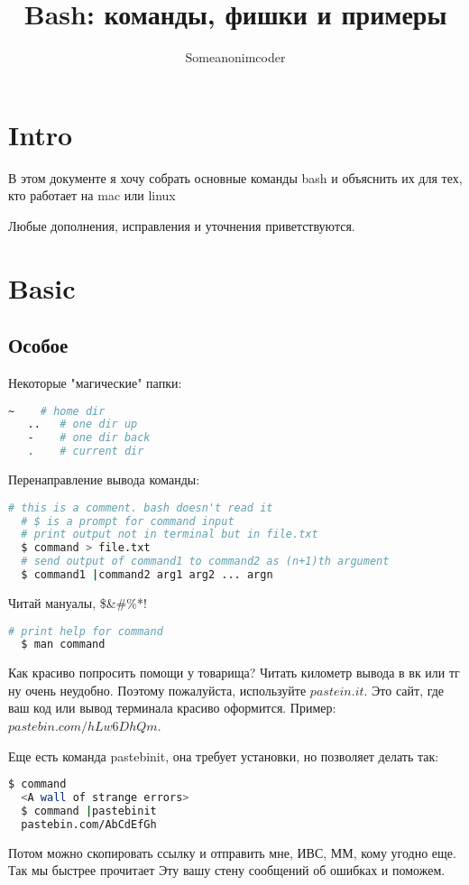 \documentclass[11pt]{article}
\title{\textbf{Bash: команды, фишки и примеры}}
\author{Someanonimcoder}
\date{}
\begin{document}
\maketitle
\thispagestyle{empty}

\section*{Intro}
В этом документе я хочу собрать основные команды bash и объяснить их для тех, кто работает на mac или linux

Любые дополнения, исправления и уточнения приветствуются.

\section*{Basic}
\subsection*{Особое}
Некоторые "магические" папки:
\begin{lstlisting}[language=bash]
   ~    # home dir 
   ..   # one dir up
   -    # one dir back
   .    # current dir
\end{lstlisting}
Перенаправление вывода команды:
\begin{lstlisting}[language=bash]
  # this is a comment. bash doesn't read it
  # $ is a prompt for command input
  # print output not in terminal but in file.txt
  $ command > file.txt     
  # send output of command1 to command2 as (n+1)th argument
  $ command1 |command2 arg1 arg2 ... argn
\end{lstlisting}
Читай мануалы, \$\&\#\%*!
\begin{lstlisting}[language=bash]
  # print help for command
  $ man command     
\end{lstlisting}
Как красиво попросить помощи у товарища? Читать километр вывода в вк или тг ну очень неудобно. Поэтому пожалуйста, используйте $pastein.it$. Это сайт, где ваш код или вывод терминала красиво оформится. Пример: $pastebin.com/hLw6DhQm$.

Еще есть команда pastebinit, она требует установки, но позволяет делать так:
\begin{lstlisting}[language=bash]
  $ command
  <A wall of strange errors>
  $ command |pastebinit
  pastebin.com/AbCdEfGh
\end{lstlisting}
Потом можно скопировать ссылку и отправить мне, ИВС, ММ, кому угодно еще. Так мы быстрее прочитает Эту вашу стену сообщений об ошибках и поможем. 
\end{document}
